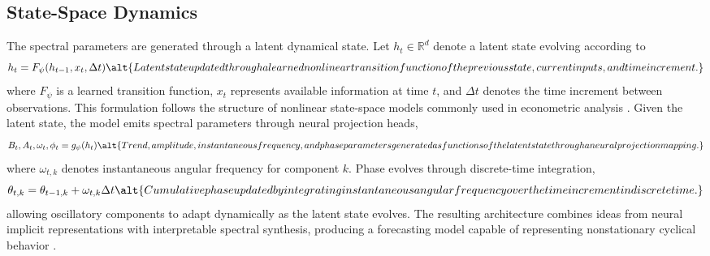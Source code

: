 \subsection{State-Space Dynamics}
The spectral parameters are generated through a latent dynamical state. Let $h_t \in \mathbb{R}^d$ denote a latent state evolving according to
\begin{equation}
h_t = F_{\psi}(h_{t-1}, x_t, \Delta t)
\alt{Latent state updated through a learned nonlinear transition function of the previous state, current inputs, and time increment.}
\end{equation}
where $F_{\psi}$ is a learned transition function, $x_t$ represents available information at time $t$, and $\Delta t$ denotes the time increment between observations. This formulation follows the structure of nonlinear state-space models commonly used in econometric analysis \cite{durbin2012statespace}.
Given the latent state, the model emits spectral parameters through neural projection heads,
\begin{equation}
B_t, A_t, \omega_t, \phi_t = g_{\psi}(h_t)
\alt{Trend, amplitude, instantaneous frequency, and phase parameters generated as functions of the latent state through a neural projection mapping.}
\end{equation}
where $\omega_{t,k}$ denotes instantaneous angular frequency for component $k$. Phase evolves through discrete-time integration,
\begin{equation}
\theta_{t,k} = \theta_{t-1,k} + \omega_{t,k}\Delta t
\alt{Cumulative phase updated by integrating instantaneous angular frequency over the time increment in discrete time.}
\end{equation}
allowing oscillatory components to adapt dynamically as the latent state evolves. The resulting architecture combines ideas from neural implicit representations with interpretable spectral synthesis, producing a forecasting model capable of representing nonstationary cyclical behavior \cite{sitzmann2020siren}.
